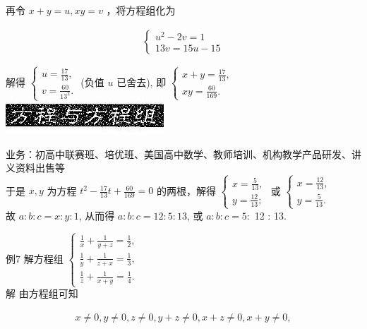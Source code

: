 \documentclass[10pt]{article}
\begin{document}
再令 $x+y=u, x y=v$ ，将方程组化为

\begin{align*}
\left\{\begin{array}{l}
u^{2}-2 v=1 \\
13 v=15 u-15
\end{array}\right.
\end{align*}

解得 $\left\{\begin{array}{l}u=\frac{17}{13}, \\ v=\frac{60}{13^{2}} .\end{array}\right.$ (负值 $u$ 已舍去), 即 $\left\{\begin{array}{l}x+y=\frac{17}{13}, \\ x y=\frac{60}{169} .\end{array}\right.$\\
\includegraphics[max width=\textwidth, center]{2024_10_30_26b590fd1106d28139f0g-090}

业务：初高中联赛班、培优班、美国高中数学、教师培训、机构教学产品研发、讲义资料出售等\\
于是 $x, y$ 为方程 $t^{2}-\frac{17}{13} t+\frac{60}{169}=0$ 的两根，解得 $\left\{\begin{array}{l}x=\frac{5}{13}, \\ y=\frac{12}{13} ;\end{array}\right.$ 或 $\left\{\begin{array}{l}x=\frac{12}{13}, \\ y=\frac{5}{13} .\end{array}\right.$\\
故 $a: b: c=x: y: 1$, 从而得 $a: b: c=12: 5: 13$, 或 $a: b: c=5:$ 12 : 13.

例7 解方程组 $\left\{\begin{array}{l}\frac{1}{x}+\frac{1}{y+z}=\frac{1}{2}, \\ \frac{1}{y}+\frac{1}{z+x}=\frac{1}{3}, \\ \frac{1}{z}+\frac{1}{x+y}=\frac{1}{4} .\end{array}\right.$\\
解 由方程组可知

\begin{align*}
x \neq 0, y \neq 0, z \neq 0, y+z \neq 0, x+z \neq 0, x+y \neq 0, \tag{1}
\end{align*}
\end{document}
